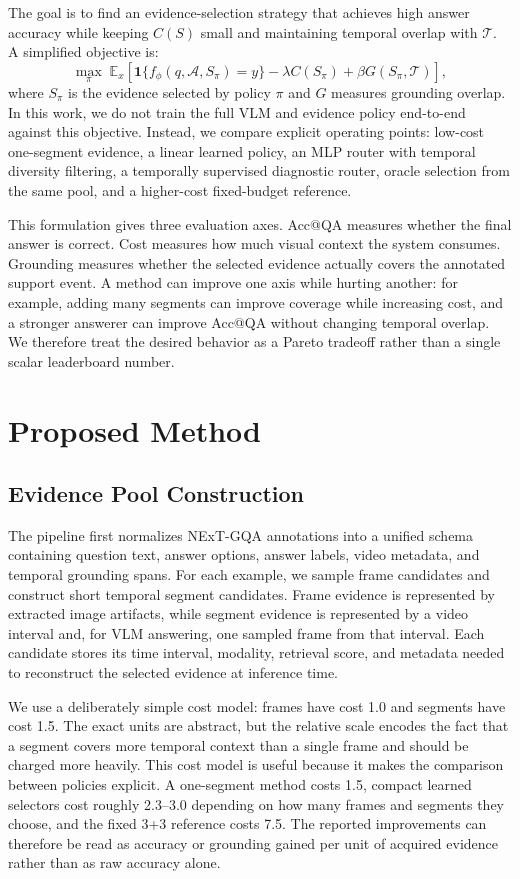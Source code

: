 \documentclass{article}
\begin{document}
The goal is to find an evidence-selection strategy that achieves high answer accuracy while keeping $C(S)$ small and maintaining temporal overlap with $\mathcal{T}$. A simplified objective is:
\[
  \max_{\pi} \; \mathbb{E}_{x}\left[
    \mathbf{1}\{f_\phi(q,\mathcal{A},S_\pi)=y\}
    - \lambda C(S_\pi)
    + \beta G(S_\pi,\mathcal{T})
  \right],
\]
where $S_\pi$ is the evidence selected by policy $\pi$ and $G$ measures grounding overlap. In this work, we do not train the full VLM and evidence policy end-to-end against this objective. Instead, we compare explicit operating points: low-cost one-segment evidence, a linear learned policy, an MLP router with temporal diversity filtering, a temporally supervised diagnostic router, oracle selection from the same pool, and a higher-cost fixed-budget reference.

This formulation gives three evaluation axes. Acc@QA measures whether the final answer is correct. Cost measures how much visual context the system consumes. Grounding measures whether the selected evidence actually covers the annotated support event. A method can improve one axis while hurting another: for example, adding many segments can improve coverage while increasing cost, and a stronger answerer can improve Acc@QA without changing temporal overlap. We therefore treat the desired behavior as a Pareto tradeoff rather than a single scalar leaderboard number.

\section{Proposed Method}
\subsection{Evidence Pool Construction}
The pipeline first normalizes NExT-GQA annotations into a unified schema containing question text, answer options, answer labels, video metadata, and temporal grounding spans. For each example, we sample frame candidates and construct short temporal segment candidates. Frame evidence is represented by extracted image artifacts, while segment evidence is represented by a video interval and, for VLM answering, one sampled frame from that interval. Each candidate stores its time interval, modality, retrieval score, and metadata needed to reconstruct the selected evidence at inference time.

We use a deliberately simple cost model: frames have cost 1.0 and segments have cost 1.5. The exact units are abstract, but the relative scale encodes the fact that a segment covers more temporal context than a single frame and should be charged more heavily. This cost model is useful because it makes the comparison between policies explicit. A one-segment method costs 1.5, compact learned selectors cost roughly 2.3--3.0 depending on how many frames and segments they choose, and the fixed 3+3 reference costs 7.5. The reported improvements can therefore be read as accuracy or grounding gained per unit of acquired evidence rather than as raw accuracy alone.
\end{document}
